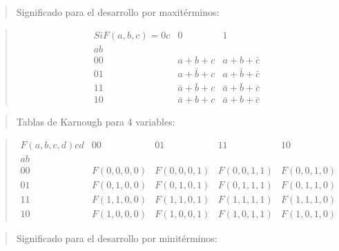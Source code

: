 \documentclass[
]{article}
\begin{document}
\begin{quote}
Significado para el desarrollo por maxitérminos:
\end{quote}

\begin{quote}
\[\begin{matrix}
{\mathit{Si}F{{({a,b,c})} = 0}c} & 0 & 1 \\
\mathit{ab} & & \\
00 & {{a + b} + c} & {{a + b} + \bar{c}} \\
01 & {{a + \bar{b}} + c} & {{a + \bar{b}} + \bar{c}} \\
11 & {{\bar{a} + \bar{b}} + c} & {{\bar{a} + \bar{b}} + \bar{c}} \\
10 & {{\bar{a} + b} + c} & {{\bar{a} + b} + \bar{c}}
\end{matrix}\]
\end{quote}

\begin{quote}
Tablas de Karnough para 4 variables:
\end{quote}

\begin{quote}
\[\begin{matrix}
{F{({a,b,c,d})}\mathit{cd}} & 00 & 01 & 11 & 10 \\
\mathit{ab} & & & & \\
00 & {F{({0,0,0,0})}} & {F{({0,0,0,1})}} & {F{({0,0,1,1})}} & {F{({0,0,1,0})}} \\
01 & {F{({0,1,0,0})}} & {F{({0,1,0,1})}} & {F{({0,1,1,1})}} & {F{({0,1,1,0})}} \\
11 & {F{({1,1,0,0})}} & {F{({1,1,0,1})}} & {F{({1,1,1,1})}} & {F{({1,1,1,0})}} \\
10 & {F{({1,0,0,0})}} & {F{({1,0,0,1})}} & {F{({1,0,1,1})}} & {F{({1,0,1,0})}}
\end{matrix}\]
\end{quote}

\begin{quote}
Significado para el desarrollo por minitérminos:
\end{quote}
\end{document}
